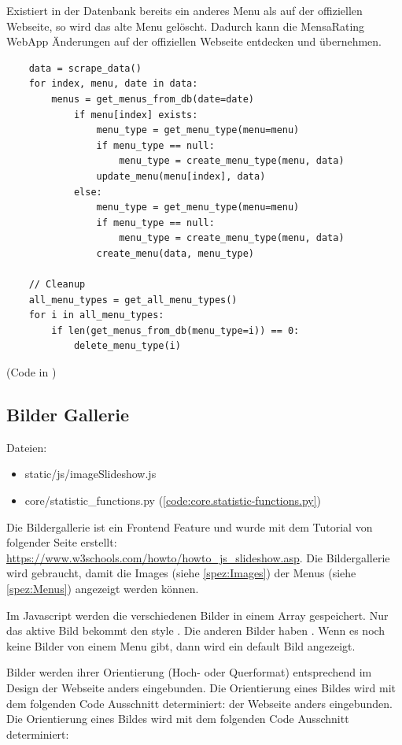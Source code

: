 Existiert in der Datenbank bereits ein anderes Menu als auf der offiziellen
Webseite, so wird das alte Menu gelöscht. Dadurch kann die MensaRating WebApp
Änderungen auf der offiziellen Webseite entdecken und übernehmen.

\begin{lstlisting}
    data = scrape_data()
    for index, menu, date in data:
        menus = get_menus_from_db(date=date)
            if menu[index] exists:
                menu_type = get_menu_type(menu=menu)
                if menu_type == null:
                    menu_type = create_menu_type(menu, data)
                update_menu(menu[index], data)
            else:
                menu_type = get_menu_type(menu=menu)
                if menu_type == null:
                    menu_type = create_menu_type(menu, data)
                create_menu(data, menu_type)
    
    // Cleanup
    all_menu_types = get_all_menu_types()
    for i in all_menu_types:
        if len(get_menus_from_db(menu_type=i)) == 0:
            delete_menu_type(i)
\end{lstlisting}

(Code in )

\subsection{Bilder Gallerie} \label{spez:Gallerie}

Dateien:
\begin{itemize}
    \item static/js/imageSlideshow.js
    \item core/statistic\_functions.py (\ref{code:core.statistic-functions.py})
\end{itemize}

Die Bildergallerie ist ein Frontend Feature und wurde mit dem Tutorial von
folgender Seite erstellt:
\url{https://www.w3schools.com/howto/howto_js_slideshow.asp}. Die Bildergallerie
wird gebraucht, damit die Images (siehe \ref{spez:Images}) der Menus (siehe
\ref{spez:Menus}) angezeigt werden können.

Im Javascript werden die verschiedenen Bilder in einem Array gespeichert. Nur
das aktive Bild bekommt den style . Die anderen Bilder
haben . Wenn es noch keine Bilder von einem Menu gibt, dann
wird ein default Bild angezeigt.

Bilder werden ihrer Orientierung (Hoch- oder Querformat) entsprechend im Design
der Webseite anders eingebunden. Die Orientierung eines Bildes wird mit dem
folgenden Code Ausschnitt determiniert:
der Webseite anders eingebunden. Die Orientierung eines Bildes wird mit dem
folgenden Code Ausschnitt determiniert:


